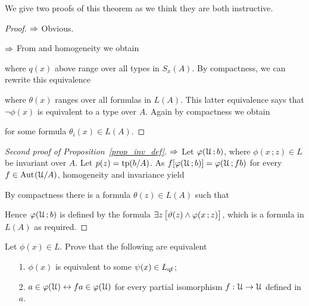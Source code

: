 \documentclass[creche.tex]{subfiles}
\begin{document}
We give two proofs of this theorem as we think they are both instructive. 

\begin{proof}
$\Rightarrow$ Obvious.

$\Rightarrow$ From  and homogeneity we obtain


where $q(x)$ above range over all types in $S_x(A)$. By compactness, we can rewrite this equivalence 


where $\theta(x)$ ranges over all formulas in $L(A)$.  This latter equivalence says that $\neg\phi(x)$ is equivalent to a type over $A$. Again by compactness we obtain 


for some formula $\theta_i(x)\in L(A)$.
\end{proof}


\begin{proof}[Second proof of Proposition~\ref{prop_inv_def}] $\Rightarrow$ Let $\varphi(\EuScript U\,;b)$, where $\phi(x\,;z)\in L$ be invariant over $A$. Let $p(z)={\rm tp}(b/A)$. As $f[\varphi(\EuScript U\,;b)]=\varphi(\EuScript U\,;fb)$  for every $f\in\textrm{Aut\kern.15ex}(\EuScript U/A)$, homogeneity and invariance yield


By compactness there is a formula $\theta(z)\in L(A)$ such that 


Hence  $\varphi(\EuScript U\,;b)$ is defined by the formula $\exists z\,\big[\vartheta(z)\wedge\varphi(x\,;z)\big]$, which is a formula in $L(A)$ as required.
\end{proof}

\begin{exercise}
Let $\phi(x)\in L$. Prove that the following are equivalent
\begin{itemize}
 \item[1.] $\phi(x)$ is equivalent to some $\psi(x)\in L_{\rm qf}$;
 \item[2.] $a\in\varphi(\EuScript U)\leftrightarrow fa\in\varphi(\EuScript U)$ for every partial isomorphism $f:\EuScript U\to\EuScript U$ defined in $a$.\QED
\end{itemize}
\end{exercise}
\end{document}
